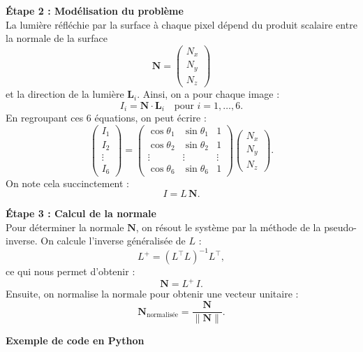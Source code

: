 \vspace{0.5em}
\textbf{Étape 2 : Modélisation du problème}\\
La lumière réfléchie par la surface à chaque pixel dépend du produit scalaire entre la normale de la surface 
\[
\mathbf{N} = \begin{pmatrix} N_x \\ N_y \\ N_z \end{pmatrix}
\]
et la direction de la lumière \(\mathbf{L}_i\). Ainsi, on a pour chaque image :
\[
I_i = \mathbf{N} \cdot \mathbf{L}_i \quad \text{pour } i=1,\dots,6.
\]
En regroupant ces 6 équations, on peut écrire :
\[
\begin{pmatrix}
I_1 \\ I_2 \\ \vdots \\ I_6
\end{pmatrix}
=
\begin{pmatrix}
\cos\theta_1 & \sin\theta_1 & 1\\[1mm]
\cos\theta_2 & \sin\theta_2 & 1\\[1mm]
\vdots & \vdots & \vdots\\[1mm]
\cos\theta_6 & \sin\theta_6 & 1
\end{pmatrix}
\begin{pmatrix}
N_x \\ N_y \\ N_z
\end{pmatrix}.
\]
On note cela succinctement :
\[
I = L\, \mathbf{N}.
\]

\vspace{0.5em}
\textbf{Étape 3 : Calcul de la normale}\\
Pour déterminer la normale \(\mathbf{N}\), on résout le système par la méthode de la pseudo-inverse. On calcule l'inverse généralisée de \(L\) :
\[
L^+ = (L^\top L)^{-1} L^\top,
\]
ce qui nous permet d'obtenir :
\[
\mathbf{N} = L^+ \, I.
\]
Ensuite, on normalise la normale pour obtenir une vecteur unitaire :
\[
\mathbf{N}_{\text{normalisée}} = \frac{\mathbf{N}}{\|\mathbf{N}\|}.
\]

\vspace{0.5em}
\textbf{Exemple de code en Python}

